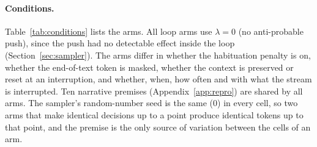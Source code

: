 \paragraph{Conditions.} Table~\ref{tab:conditions} lists the arms. All loop
arms use $\lambda=0$ (no anti-probable push), since the push had no
detectable effect inside the loop (Section~\ref{sec:sampler}). The arms
differ in whether the habituation penalty is on, whether the end-of-text
token is masked, whether the context is preserved or reset at an
interruption, and whether, when, how often and with what the stream is
interrupted. Ten narrative premises (Appendix~\ref{app:repro}) are shared by
all arms. The sampler's random-number seed is the same (0) in every cell, so
two arms that make identical decisions up to a point produce identical
tokens up to that point, and the premise is the only source of variation
between the cells of an arm.

